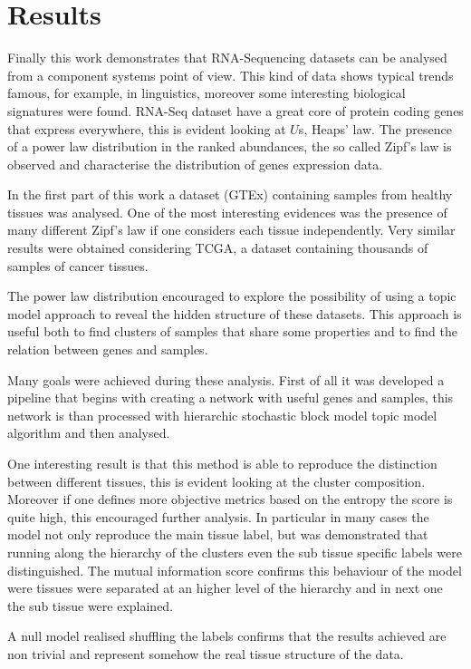 \chapter{Results}\label{ch:results}
Finally this work demonstrates that RNA-Sequencing datasets can be analysed from a component systems point of view.
This kind of data shows typical trends famous, for example, in linguistics, moreover some interesting biological signatures were found. RNA-Seq dataset have a great core of protein coding genes that express everywhere, this is evident looking at $U$s, Heaps' law. The presence of a power law distribution in the ranked abundances, the so called Zipf's law is observed and characterise the distribution of genes expression data.

In the first part of this work a dataset (GTEx) containing samples from healthy tissues was analysed. One of the most interesting evidences was the presence of many different Zipf's law if one considers each tissue independently. Very similar results were obtained considering TCGA, a dataset containing thousands of samples of cancer tissues.

The power law distribution encouraged to explore the possibility of using a topic model approach to reveal the hidden structure of these datasets. This approach is useful both to find clusters of samples that share some properties and to find the relation between genes and samples.

Many goals were achieved during these analysis.
First of all it was developed a pipeline that begins with creating a network with useful genes and samples, this network is than processed with hierarchic stochastic block model topic model algorithm and then analysed.

One interesting result is that this method is able to reproduce the distinction between different tissues, this is evident looking at the cluster composition. Moreover if one defines more objective metrics based on the entropy the score is quite high, this encouraged further analysis.
In particular in many cases the model not only reproduce the main tissue label, but was demonstrated that running along the hierarchy of the clusters even the sub tissue specific labels were distinguished. The mutual information score confirms this behaviour of the model were tissues were separated at an higher level of the hierarchy and in next one the sub tissue were explained.

A null model realised shuffling the labels confirms that the results achieved are non trivial and represent somehow the real tissue structure of the data.


